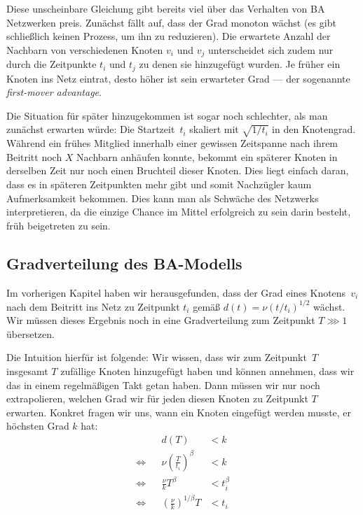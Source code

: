 Diese unscheinbare Gleichung gibt bereits viel über das Verhalten von BA Netzwerken preis.
Zunächst fällt auf, dass der Grad monoton wächst (es gibt schließlich keinen Prozess, um ihn zu reduzieren).
Die erwartete Anzahl der Nachbarn von verschiedenen Knoten $v_i$ und $v_j$ unterscheidet sich zudem nur durch die Zeitpunkte $t_i$ und $t_j$ zu denen sie hinzugefügt wurden.
Je früher ein Knoten ins Netz eintrat, desto höher ist sein erwarteter Grad --- der sogenannte  \emph{first-mover advantage}.

Die Situation für später hinzugekommen ist sogar noch schlechter, als man zunächst erwarten würde:
Die Startzeit~$t_i$ skaliert mit $\sqrt{1 / t_i}$ in den Knotengrad.
Während ein frühes Mitglied innerhalb einer gewissen Zeitspanne nach ihrem Beitritt noch $X$ Nachbarn anhäufen konnte, bekommt ein späterer Knoten in derselben Zeit nur noch einen Bruchteil dieser Knoten.
Dies liegt einfach daran, dass es in späteren Zeitpunkten mehr  gibt und somit Nachzügler kaum Aufmerksamkeit bekommen.
Dies kann man als Schwäche des Netzwerks interpretieren, da die einzige Chance im Mittel erfolgreich zu sein darin besteht, früh beigetreten zu sein.

\subsection{Gradverteilung des BA-Modells}
Im vorherigen Kapitel haben wir herausgefunden, dass der Grad eines Knotens~$v_i$ nach dem Beitritt ins Netz zu Zeitpunkt $t_i$ gemäß $d(t) = \nu (t  / t_i)^{1/2}$ wächst.
Wir müssen dieses Ergebnis noch in eine Gradverteilung zum Zeitpunkt $T \ggg 1$ übersetzen.

Die Intuition hierfür ist folgende:
Wir wissen, dass wir zum Zeitpunkt~$T$ insgesamt $T$ zufällige Knoten hinzugefügt haben und können annehmen, dass wir das in einem regelmäßigen Takt getan haben.
Dann müssen wir nur noch extrapolieren, welchen Grad wir für jeden diesen Knoten zu Zeitpunkt $T$ erwarten.
Konkret fragen wir uns, wann ein Knoten eingefügt werden musste, \sd er höchsten Grad $k$ hat:
\begin{align}
                    &  & d(T)                                   & < k         \\
    \Leftrightarrow &  & \nu \left(\frac{T}{t_i}\right)^\beta   & < k         \\
    \Leftrightarrow &  & \frac{\nu}{k} T^\beta                  & < t_i^\beta \\
    \Leftrightarrow &  & \left(\frac{\nu}{k}\right)^{1/\beta} T & < t_i
\end{align}


